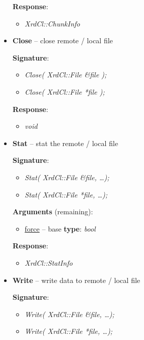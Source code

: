 \documentclass{article}
\begin{document}
\begin{itemize}
					\textbf{Response}:
					\begin{itemize}
					  \item \textit{XrdCl::ChunkInfo}
					\end{itemize}
					
				  \item \textbf{Close} -- close remote / local file
				  
				  	\textbf{Signature}:
				  	\begin{itemize} 
			          \item \textit{Close( XrdCl::File \&file );}
			          \item \textit{Close( XrdCl::File *file );}
			        \end{itemize}
			    
					\textbf{Response}:
					\begin{itemize}
					  \item \textit{void}
					\end{itemize}
					
				  \item \textbf{Stat} -- stat the remote / local file
				  
				  	\textbf{Signature}:
				  	\begin{itemize} 
			          \item \textit{Stat( XrdCl::File \&file, \ldots);}
			          \item \textit{Stat( XrdCl::File *file, \ldots );}
			        \end{itemize}
			        
			        \textbf{Arguments} (remaining):
					\begin{itemize}
					  \item \underline{force} -- base \textbf{type}: \textit{bool}
				    \end{itemize}
				    
					\textbf{Response}:
					\begin{itemize}
					  \item \textit{XrdCl::StatInfo}
					\end{itemize}
					
				  \item \textbf{Write} -- write data to remote / local file
				  
				  	\textbf{Signature}:
				  	\begin{itemize} 
			          \item \textit{Write( XrdCl::File \&file, \ldots);}
			          \item \textit{Write( XrdCl::File *file, \ldots );}
			        \end{itemize}
			        

\end{itemize}
\end{document}
